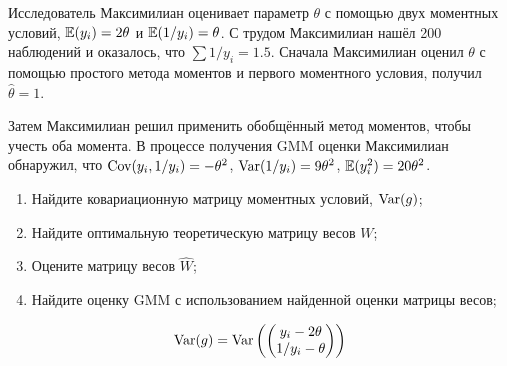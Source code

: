 \begin{problem}
Исследователь Максимилиан оценивает параметр $\theta$ с помощью двух моментных условий, $\operatorname{\mathbb E}(y_i)=2\theta$ и $\operatorname{\mathbb E}(1/y_i)=\theta$.
С трудом Максимилиан нашёл 200 наблюдений и оказалось, что $\sum 1/y_i = 1.5$.
Сначала Максимилиан оценил $\theta$ с помощью простого метода моментов и первого моментного условия, получил $\hat\theta = 1$.

Затем Максимилиан решил применить обобщённый метод моментов, чтобы учесть оба момента.
В процессе получения GMM оценки Максимилиан обнаружил, что $\operatorname{Cov}(y_i, 1/y_i)=-\theta^2$, $\operatorname{Var}(1/y_i)=9\theta^2$, $\operatorname{\mathbb E}(y_i^2)=20\theta^2$.

\begin{enumerate}
	\item Найдите ковариационную матрицу моментных условий, $\operatorname{Var}(g)$;
	\item Найдите оптимальную теоретическую матрицу весов $W$;
	\item Оцените матрицу весов $\hat W$;
	\item Найдите оценку GMM с использованием найденной оценки матрицы весов;
\end{enumerate}


\begin{sol}
\[
\operatorname{Var}(g)=\operatorname{Var}\left(
\begin{pmatrix}
y_i - 2\theta \\
1/y_i - \theta\\
\end{pmatrix}
\right)
\]
\end{sol}
\end{problem}




